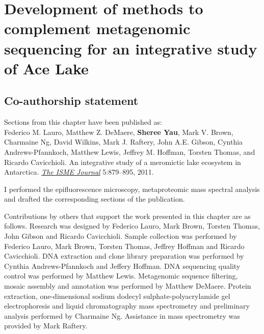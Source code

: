 \chapter[Development of methods to complement metagenomic sequencing for an integrative study of Ace Lake]{Development of methods to complement metagenomic sequencing for an integrative study of Ace Lake}
\label{ch:ace}
\acresetall

\section*{Co-authorship statement}

Sections from this chapter have been published as:\\

Federico M. Lauro, Matthew Z. DeMaere, \textbf{Sheree Yau}, Mark V. Brown, Charmaine Ng,
David Wilkins, Mark J. Raftery, John A.E. Gibson, Cynthia Andrews-Pfannkoch, Matthew Lewis,
Jeffrey M. Hoffman, Torsten Thomas, and Ricardo Cavicchioli. 
An integrative study of a meromictic lake ecosystem in Antarctica. \emph{\underline{The ISME Journal}} 
5:879--895, 2011.

I performed the epifluorescence microscopy, metaproteomic mass spectral analysis and drafted the corresponding sections of the publication.

Contributions by others that support the work presented in this chapter are as follows.
Research was designed by Federico Lauro, Mark Brown, Torsten Thomas, John Gibson and Ricardo Cavicchioli.
Sample collection was performed by Federico Lauro, Mark Brown, Torsten Thomas, Jeffrey Hoffman and Ricardo Cavicchioli.
\textsc{DNA} extraction and clone library preparation was performed by Cynthia Andrews-Pfannkoch and Jeffery Hoffman.
\textsc{DNA} sequencing quality control was performed by Matthew Lewis.
Metagenomic sequence filtering, mosaic assembly and annotation was performed by Matthew DeMaere.
Protein extraction, one-dimensional sodium dodecyl sulphate-polyacrylamide gel electrophoresis and liquid chromatography mass spectrometry and preliminary analysis performed by Charmaine Ng.
Assistance in mass spectrometry was provided by Mark Raftery.
\newpage

